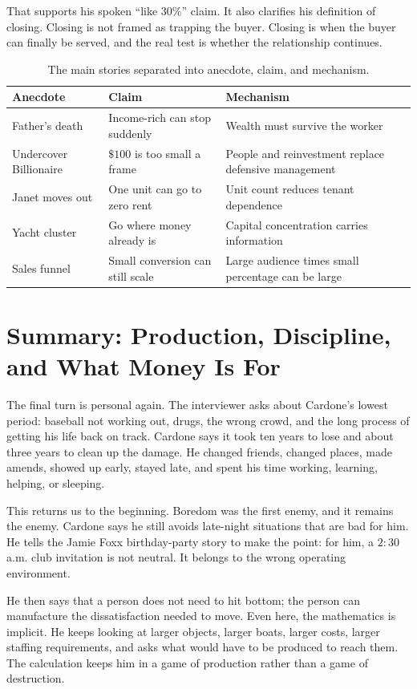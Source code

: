 That supports his spoken ``like \(30\%\)'' claim. It also clarifies his definition of closing. Closing is not framed as trapping the buyer. Closing is when the buyer can finally be served, and the real test is whether the relationship continues.

\begin{table}
\centering
\begin{tabular}{p{.22\linewidth}p{.32\linewidth}p{.34\linewidth}}
\hline
Anecdote & Claim & Mechanism\\
\hline
Father's death & Income-rich can stop suddenly & Wealth must survive the worker\\
\hline
Undercover Billionaire & \(\$100\) is too small a frame & People and reinvestment replace defensive management\\
\hline
Janet moves out & One unit can go to zero rent & Unit count reduces tenant dependence\\
\hline
Yacht cluster & Go where money already is & Capital concentration carries information\\
\hline
Sales funnel & Small conversion can still scale & Large audience times small percentage can be large\\
\hline
\end{tabular}
\caption{The main stories separated into anecdote, claim, and mechanism.}
\end{table}

\section{Summary: Production, Discipline, and What Money Is For}

The final turn is personal again. The interviewer asks about Cardone's lowest period: baseball not working out, drugs, the wrong crowd, and the long process of getting his life back on track. Cardone says it took ten years to lose and about three years to clean up the damage. He changed friends, changed places, made amends, showed up early, stayed late, and spent his time working, learning, helping, or sleeping.

This returns us to the beginning. Boredom was the first enemy, and it remains the enemy. Cardone says he still avoids late-night situations that are bad for him. He tells the Jamie Foxx birthday-party story to make the point: for him, a \(2{:}30\) a.m. club invitation is not neutral. It belongs to the wrong operating environment.

He then says that a person does not need to hit bottom; the person can manufacture the dissatisfaction needed to move. Even here, the mathematics is implicit. He keeps looking at larger objects, larger boats, larger costs, larger staffing requirements, and asks what would have to be produced to reach them. The calculation keeps him in a game of production rather than a game of destruction.

